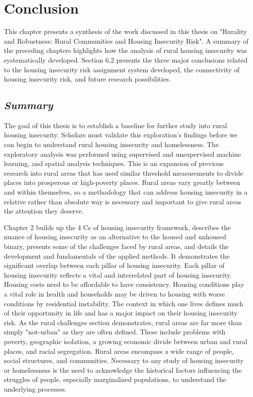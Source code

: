 \chapter{Conclusion}	%

This chapter presents a synthesis of the work discussed in this thesis on "Rurality and Robustness: Rural Communities and Housing Insecurity Risk". A summary of the preceding chapters highlights how the analysis of rural housing insecurity was systematically developed. Section 6.2 presents the three major conclusions related to the housing insecurity risk assignment system developed, the connectivity of housing insecurity risk, and future research possibilities. 

\section{\textit{Summary}}

The goal of this thesis is to establish a baseline for further study into rural housing insecurity. Scholars must validate this exploration's findings before we can begin to understand rural housing insecurity and homelessness. The exploratory analysis was performed using supervised and unsupervised machine learning, and spatial analysis techniques. This is an expansion of previous research into rural areas that has used similar threshold measurements to divide places into prosperous or high-poverty places. Rural areas vary greatly between and within themselves, so a methodology that can address housing insecurity in a relative rather than absolute way is necessary and important to give rural areas the attention they deserve. 

Chapter 2 builds up the 4 Cs of housing insecurity framework, describes the nuance of housing insecurity as an alternative to the housed and unhoused binary, presents some of the challenges faced by rural areas, and details the development and fundamentals of the applied methods. It demonstrates the significant overlap between each pillar of housing insecurity. Each pillar of housing insecurity reflects a vital and interrelated part of housing insecurity. Housing costs need to be affordable to have consistency. Housing conditions play a vital role in health and households may be driven to housing with worse conditions by residential instability. The context in which one lives defines much of their opportunity in life and has a major impact on their housing insecurity risk. As the rural challenges section demonstrates, rural areas are far more than simply "not-urban" as they are often defined. These include problems with poverty, geographic isolation, a growing economic divide between urban and rural places, and racial segregation. Rural areas encompass a wide range of people, social structures, and communities. Necessary to any study of housing insecurity or homelessness is the need to acknowledge the historical factors influencing the struggles of people, especially marginalized populations, to understand the underlying processes. 

